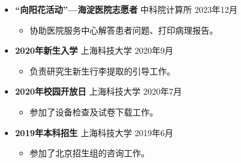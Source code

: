 \documentclass[a4paper,10pt]{ctexart} %
\begin{document}
    \begin{itemize}
        \item \textbf{“向阳花活动”—海淀医院志愿者} \hfill 中科院计算所 \quad 2023年12月
            \begin{small} \begin{itemize}
                \item 协助医院服务中心解答患者问题、打印病理报告。
            \end{itemize} \end{small}
        \item \textbf{2020年新生入学} \hfill 上海科技大学 \quad 2020年9月
            \begin{small} \begin{itemize}
                \item 负责研究生新生行李提取的引导工作。
            \end{itemize} \end{small}
        \item \textbf{2020年校园开放日} \hfill 上海科技大学 \quad 2020年7月
            \begin{small} \begin{itemize}
                \item 参加了设备检查及试卷下载工作。
            \end{itemize} \end{small}
        \item \textbf{2019年本科招生}  \hfill 上海科技大学 \quad 2019年6月
            \begin{small} \begin{itemize}
                \item 参加了北京招生组的咨询工作。
            \end{itemize} \end{small}
    \end{itemize}
\end{document}
